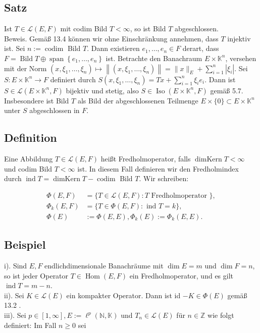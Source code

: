 \documentclass[10pt, letterpaper]{article}
\begin{document}
\subsection*{Satz}
Ist $T \in \mathcal{L}(E, F)$ mit codim Bild $T<\infty$, so ist Bild $T$ abgeschlossen.\\
Beweis. Gemäß 13.4 können wir ohne Einschränkung annehmen, dass $T$ injektiv ist. Sei $n:=\operatorname{codim}$ Bild $T$. Dann existieren $e_{1}, \ldots, e_{n} \in F$ derart, dass $F=\operatorname{Bild} T \oplus \operatorname{span}\left\{e_{1}, \ldots, e_{n}\right\}$ ist. Betrachte den Banachraum $E \times \mathbb{K}^{n}$, versehen mit der Norm $\left(x, \xi_{1}, \ldots, \xi_{n}\right) \mapsto\left\|\left(x, \xi_{1}, \ldots, \xi_{n}\right)\right\|=\|x\|_{E}+\sum_{i=1}^{n}\left|\xi_{i}\right|$. Sei $S: E \times \mathbb{K}^{n} \rightarrow F$ definiert durch $S\left(x, \xi_{1}, \ldots, \xi_{n}\right)=T x+\sum_{i=1}^{n} \xi_{i} e_{i}$. Dann ist $S \in \mathcal{L}\left(E \times \mathbb{K}^{n}, F\right)$ bijektiv und stetig, also $S \in \operatorname{Iso}\left(E \times \mathbb{K}^{n}, F\right)$ gemäß 5.7. Insbesondere ist Bild $T$ als Bild der abgeschlossenen Teilmenge $E \times\{0\} \subset E \times \mathbb{K}^{n}$ unter $S$ abgeschlossen in $F$.

\subsection*{Definition}
Eine Abbildung $T \in \mathcal{L}(E, F)$ heißt Fredholmoperator, falls $\operatorname{dimKern} T<\infty$ und codim Bild $T<\infty$ ist. In diesem Fall definieren wir den Fredholmindex durch $\operatorname{ind} T=\operatorname{dimKern} T-\operatorname{codim}$ Bild $T$. Wir schreiben:

$$
\begin{aligned}
\Phi(E, F) & =\{T \in \mathcal{L}(E, F): T \text { Fredholmoperator }\}, \\
\Phi_{k}(E, F) & =\{T \in \Phi(E, F): \text { ind } T=k\}, \\
\Phi(E) & :=\Phi(E, E), \Phi_{k}(E):=\Phi_{k}(E, E) .
\end{aligned}
$$

\subsection*{Beispiel}
i). Sind $E, F$ endlichdimensionale Banachräume mit $\operatorname{dim} E=m$ und $\operatorname{dim} F= n$, so ist jeder Operator $T \in \operatorname{Hom}(E, F)$ ein Fredholmoperator, und es gilt $\operatorname{ind} T=m-n$.\\
ii). Sei $K \in \mathcal{L}(E)$ ein kompakter Operator. Dann ist id $-K \in \Phi(E)$ gemäß 13.2 .\\
iii). Sei $p \in[1, \infty], E:=\ell^{p}(\mathbb{N}, \mathbb{K})$ und $T_{n} \in \mathcal{L}(E)$ für $n \in \mathbb{Z}$ wie folgt definiert: Im Fall $n \geq 0$ sei
\end{document}
